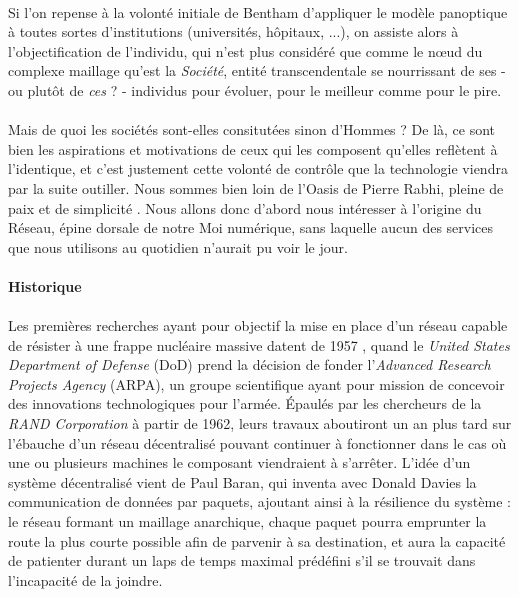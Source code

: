 \paragraph{} Si l'on repense à la volonté initiale de Bentham d'appliquer le modèle panoptique à toutes sortes d'institutions
(universités, hôpitaux, ...), on assiste alors à l'objectification de l'individu, qui n'est plus considéré que comme le 
n\oe{}ud du complexe maillage qu'est la \emph{Société}, entité transcendentale se nourrissant de ses - ou plutôt de 
\emph{ces} ? - individus pour évoluer, pour le meilleur comme pour le pire.

\paragraph{} Mais de quoi les sociétés sont-elles consitutées sinon d'Hommes ? De là, ce sont bien les aspirations et 
motivations de ceux qui les composent qu'elles reflètent à l'identique, et c'est justement cette volonté de contrôle que
la technologie viendra par la suite outiller. Nous sommes bien loin de l'Oasis de Pierre Rabhi, pleine de paix et de
simplicité \cite{Rabhi1}. Nous allons donc d'abord nous intéresser à l'origine du Réseau, épine dorsale de notre Moi 
numérique, sans laquelle aucun des services que nous utilisons au quotidien n'aurait pu voir le jour.


\paragraph{Historique}

\paragraph{} Les premières recherches ayant pour objectif la mise en place d'un réseau capable de résister à une frappe
nucléaire massive datent de 1957 \cite{Internet0}, quand le \emph{United States Department of Defense} (DoD) prend la
décision de fonder l'\emph{Advanced Research Projects Agency} (ARPA), un groupe scientifique ayant pour mission de concevoir
des innovations technologiques pour l'armée. Épaulés par les chercheurs de la \emph{RAND Corporation} à partir de 1962,
leurs travaux aboutiront un an plus tard sur l'ébauche d'un réseau décentralisé pouvant continuer à fonctionner dans le
cas où une ou plusieurs machines le composant viendraient à s'arrêter. L'idée d'un système décentralisé vient de Paul Baran,
qui inventa avec Donald Davies la communication de données par paquets, ajoutant ainsi à la résilience du système : le réseau
formant un maillage anarchique, chaque paquet pourra emprunter la route la plus courte possible afin de parvenir à sa 
destination, et aura la capacité de patienter durant un laps de temps maximal prédéfini s'il se trouvait dans l'incapacité
de la joindre.

